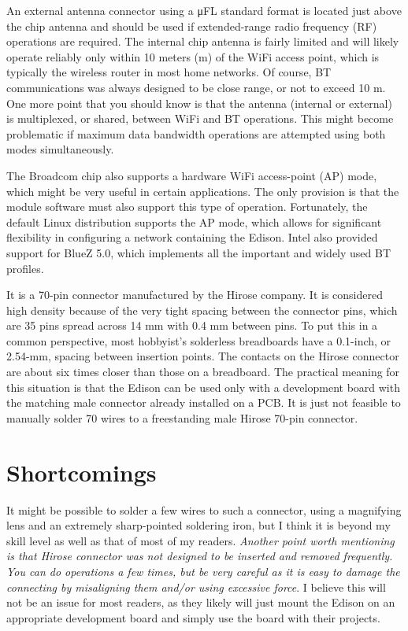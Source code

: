 \documentclass[12pt]{report}
\begin{document}
 An external antenna connector using a μFL standard format is
located just above the chip antenna and should be used if extended-range radio frequency
(RF) operations are required. The internal chip antenna is fairly limited and will likely
operate reliably only within 10 meters (m) of the WiFi access point, which is typically the
wireless router in most home networks. Of course, BT communications was always
designed to be close range, or not to exceed 10 m. One more point that you should know is
that the antenna (internal or external) is multiplexed, or shared, between WiFi and BT
operations. This might become problematic if maximum data bandwidth operations are
attempted using both modes simultaneously.

The Broadcom chip also supports a hardware WiFi access-point (AP) mode, which
might be very useful in certain applications. The only provision is that the module
software must also support this type of operation. Fortunately, the default Linux
distribution supports the AP mode, which allows for significant flexibility in configuring a
network containing the Edison. Intel also provided support for BlueZ 5.0, which
implements all the important and widely used BT profiles.

It
is a 70-pin connector manufactured by the Hirose company. It is considered high density
because of the very tight spacing between the connector pins, which are 35 pins spread
across 14 mm with 0.4 mm between pins. To put this in a common perspective, most
hobbyist’s solderless breadboards have a 0.1-inch, or 2.54-mm, spacing between insertion
points. The contacts on the Hirose connector are about six times closer than those on a
breadboard. The practical meaning for this situation is that the Edison can be used only
with a development board with the matching male connector already installed on a PCB. It
is just not feasible to manually solder 70 wires to a freestanding male Hirose 70-pin
connector.

\section{Shortcomings} 
It might be possible to solder a few wires to such a connector, using a
magnifying lens and an extremely sharp-pointed soldering iron, but I think it is beyond my
skill level as well as that of most of my readers. \emph{Another point worth mentioning is that Hirose connector was not designed to be inserted and removed frequently. You can do operations a few times, but be very careful as it is easy to damage the connecting by misaligning them and/or using excessive force}. I believe this will not be an issue
for most readers, as they likely will just mount the Edison on an appropriate development
board and simply use the board with their projects.
\end{document}
